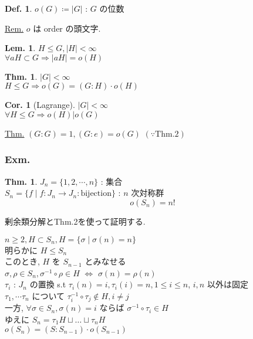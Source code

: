 \documentclass[uplatex,dvipdfmx,9pt]{beamer}
\newcounter{textThmCount}
\newcounter{textLemCount}
\newcounter{textExmCount}
\theoremstyle{definition} %
\newtheorem{defn}{Def.}[subsection] %
\newtheorem{thm}{Thm.}[subsection] %
\newtheorem{thmText}[textThmCount]{Thm.}
\newtheorem{corText}{Cor.}[textThmCount] %
\newtheorem{lemText}[textLemCount]{Lem.} %
\theoremstyle{example}
\begin{document}
      \begin{frame}

        \begin{defn}
          $o(G) \coloneqq |G|$ : $G$ の\alert{位数}
        \end{defn}
        \underline{Rem.} $o$ は order の頭文字.

        \begin{lemText}
          $H \le G, |H| < \infty$ \\
          $\forall aH \subset G \Rightarrow |aH| = o(H)$
        \end{lemText}

        \begin{thmText}
          $|G| < \infty$ \\
          $H \le G \Rightarrow o(G) = (G:H) \cdot o(H)$
        \end{thmText}

        \begin{corText}[Lagrange]
          $|G| < \infty$ \\
          $\forall H \le G \Rightarrow o(H)|o(G)$
        \end{corText}
        \underline{Thm.} $(G:G) = 1, (G:e) = o(G)$ $(\because \text{Thm.2})$
        
      \end{frame}

      \addtocounter{textExmCount}{1}
      \begin{frame}
        \frametitle{Exm. \thetextExmCount}
        
        \begin{thm}
          $J_n = \{1,2,\cdots,n\}$ : 集合 \\
          $S_n = \{f \mid f \colon J_n \rightarrow J_n :\text{bijection} \}$ : $n$ 次対称群 \\
          \[ o(S_n) = n! \]
        \end{thm}
        剰余類分解とThm.2を使って証明する.

        $n \ge 2, H \subset S_n, H = \{\sigma \mid \sigma(n) = n\}$ \\
        明らかに $H \le S_n$ \\
        このとき, $H$ を $S_{n-1}$ とみなせる\\
        $\sigma, \rho \in S_n, \sigma^{-1} \circ \rho \in H$ $\Leftrightarrow$ $\sigma(n) = \rho(n)$ \\
        $\tau_i$ : $J_n$ の置換 s.t $\tau_i(n) = i, \tau_i(i) = n, 1 \le i \le n$, $i,n$ 以外は固定 \\
        $\tau_1, \cdots \tau_n$ について $\tau_i^{-1} \circ \tau_j \notin H, i \ne j$ \\
        一方, $\forall \sigma \in S_n, \sigma(n) = i$ ならば $\sigma^{-1} \circ \tau_i \in H$ \\
        ゆえに $S_n = \tau_1H \sqcup \dots \sqcup \tau_nH$ \\
        $o(S_n) = (S:S_{n-1}) \cdot o(S_{n-1})$

      \end{frame}
\end{document}

